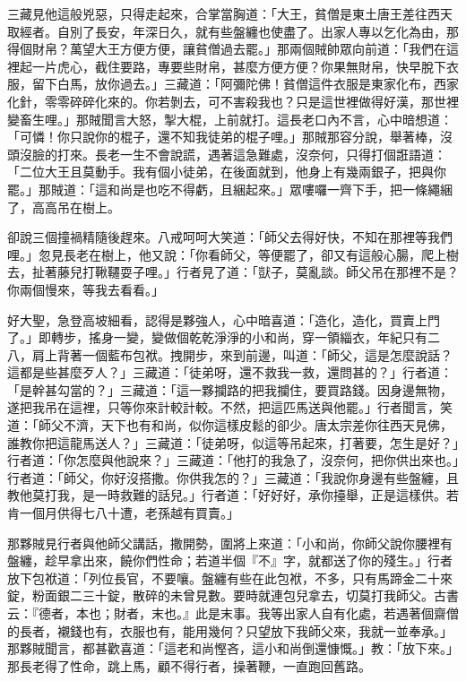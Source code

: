 三藏見他這般兇惡，只得走起來，合掌當胸道：「大王，貧僧是東土唐王差往西天取經者。自別了長安，年深日久，就有些盤纏也使盡了。出家人專以乞化為由，那得個財帛？萬望大王方便方便，讓貧僧過去罷。」那兩個賊帥眾向前道：「我們在這裡起一片虎心，截住要路，專要些財帛，甚麼方便方便？你果無財帛，快早脫下衣服，留下白馬，放你過去。」三藏道：「阿彌陀佛！貧僧這件衣服是東家化布，西家化針，零零碎碎化來的。你若剝去，可不害殺我也？只是這世裡做得好漢，那世裡變畜生哩。」那賊聞言大怒，掣大棍，上前就打。這長老口內不言，心中暗想道：「可憐！你只說你的棍子，還不知我徒弟的棍子哩。」那賊那容分說，舉著棒，沒頭沒臉的打來。長老一生不會說謊，遇著這急難處，沒奈何，只得打個誑語道：「二位大王且莫動手。我有個小徒弟，在後面就到，他身上有幾兩銀子，把與你罷。」那賊道：「這和尚是也吃不得虧，且綑起來。」眾嘍囉一齊下手，把一條繩綑了，高高吊在樹上。

卻說三個撞禍精隨後趕來。八戒呵呵大笑道：「師父去得好快，不知在那裡等我們哩。」忽見長老在樹上，他又說：「你看師父，等便罷了，卻又有這般心腸，爬上樹去，扯著藤兒打鞦韆耍子哩。」行者見了道：「獃子，莫亂談。師父吊在那裡不是？你兩個慢來，等我去看看。」

好大聖，急登高坡細看，認得是夥強人，心中暗喜道：「造化，造化，買賣上門了。」即轉步，搖身一變，變做個乾乾淨淨的小和尚，穿一領緇衣，年紀只有二八，肩上背著一個藍布包袱。拽開步，來到前邊，叫道：「師父，這是怎麼說話？這都是些甚麼歹人？」三藏道：「徒弟呀，還不救我一救，還問甚的？」行者道：「是幹甚勾當的？」三藏道：「這一夥攔路的把我攔住，要買路錢。因身邊無物，遂把我吊在這裡，只等你來計較計較。不然，把這匹馬送與他罷。」行者聞言，笑道：「師父不濟，天下也有和尚，似你這樣皮鬆的卻少。唐太宗差你往西天見佛，誰教你把這龍馬送人？」三藏道：「徒弟呀，似這等吊起來，打著要，怎生是好？」行者道：「你怎麼與他說來？」三藏道：「他打的我急了，沒奈何，把你供出來也。」行者道：「師父，你好沒搭撒。你供我怎的？」三藏道：「我說你身邊有些盤纏，且教他莫打我，是一時救難的話兒。」行者道：「好好好，承你擡舉，正是這樣供。若肯一個月供得七八十遭，老孫越有買賣。」

那夥賊見行者與他師父講話，撒開勢，圍將上來道：「小和尚，你師父說你腰裡有盤纏，趁早拿出來，饒你們性命；若道半個『不』字，就都送了你的殘生。」行者放下包袱道：「列位長官，不要嚷。盤纏有些在此包袱，不多，只有馬蹄金二十來錠，粉面銀二三十錠，散碎的未曾見數。要時就連包兒拿去，切莫打我師父。古書云：『德者，本也；財者，末也。』此是末事。我等出家人自有化處，若遇著個齋僧的長者，襯錢也有，衣服也有，能用幾何？只望放下我師父來，我就一並奉承。」那夥賊聞言，都甚歡喜道：「這老和尚慳吝，這小和尚倒還慷慨。」教：「放下來。」那長老得了性命，跳上馬，顧不得行者，操著鞭，一直跑回舊路。

